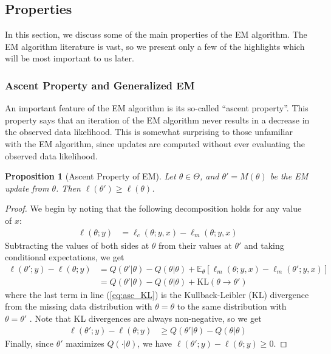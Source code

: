 \documentclass[11pt, oneside]{article}   	%
\newcommand{\bE}{\mathbb{E}}
\newtheorem{proposition}{Proposition}[section]
\begin{document}
\subsection{Properties}

In this section, we discuss some of the main properties of the EM algorithm. The EM algorithm literature is vast, so we present only a few of the highlights which will be most important to us later.

\subsubsection{Ascent Property and Generalized EM}
\label{sec:GEM}

An important feature of the EM algorithm is its so-called ``ascent property''. This property says that an iteration of the EM algorithm never results in a decrease in the observed data likelihood. This is somewhat surprising to those unfamiliar with the EM algorithm, since updates are computed without ever evaluating the observed data likelihood. 

\begin{proposition}[Ascent Property of EM]
    \label{thm2:EM_ascent}
    Let $\theta \in \Theta$, and $\theta' = M(\theta)$ be the EM update from $\theta$. Then $\ell(\theta') \geq \ell(\theta)$.
\end{proposition}

\begin{proof}
    We begin by noting that the following decomposition holds for any value of $x$:
    \begin{align}
        \ell(\theta; y) &= \ell_c(\theta; y, x) - \ell_m(\theta; y, x)
    \end{align}
    Subtracting the values of both sides at $\theta$ from their values at $\theta'$ and taking conditional expectations, we get
    \begin{align}
        \ell(\theta'; y) - \ell(\theta; y) &= Q(\theta'|\theta) - Q(\theta|\theta) + \bE_{\theta}[\ell_m(\theta; y, x) - \ell_m(\theta'; y, x)]\\
        &= Q(\theta'|\theta) - Q(\theta|\theta) + \mathrm{KL}(\theta \rightarrow \theta') \label{eq:asc_KL}
    \end{align}
    where the last term in line (\ref{eq:asc_KL}) is the Kullback-Leibler (KL) divergence from the missing data distribution with $\theta = \theta$ to the same distribution with $\theta = \theta'$ \citep{van98}. Note that KL divergences are always non-negative, so we get
    \begin{align}
    \ell(\theta'; y) - \ell(\theta; y) &\geq Q(\theta'|\theta) - Q(\theta|\theta)  \label{eq:EM_ascent}  
    \end{align}
    Finally, since $\theta'$ maximizes $Q(\cdot|\theta)$, we have $\ell(\theta'; y) - \ell(\theta; y) \geq 0$.
\end{proof}
\end{document}
